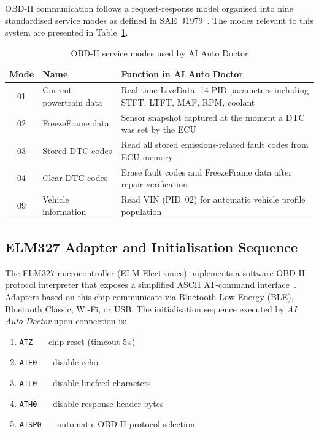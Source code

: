 OBD-II communication follows a request-response model organised into nine standardised service modes as defined in SAE~J1979~\cite{sae2020}.
The modes relevant to this system are presented in Table~\ref{tab:service_modes}.

\begin{table}[!htbp]
\centering
\caption{OBD-II service modes used by AI Auto Doctor}
\label{tab:service_modes}
\begin{tabularx}{0.95\linewidth}{c p{4cm} X}
\toprule
\rowcolor{tblhdr}
\color{white}\textbf{Mode} &
\color{white}\textbf{Name} &
\color{white}\textbf{Function in AI Auto Doctor} \\
\midrule
01 & Current powertrain data  & Real-time LiveData: 14 PID parameters including STFT, LTFT, MAF, RPM, coolant \\
02 & FreezeFrame data         & Sensor snapshot captured at the moment a DTC was set by the ECU \\
03 & Stored DTC codes         & Read all stored emissions-related fault codes from ECU memory \\
04 & Clear DTC codes          & Erase fault codes and FreezeFrame data after repair verification \\
09 & Vehicle information      & Read VIN (PID~02) for automatic vehicle profile population \\
\bottomrule
\end{tabularx}
\end{table}

\subsection{ELM327 Adapter and Initialisation Sequence}

The ELM327 microcontroller (ELM Electronics) implements a software OBD-II protocol interpreter that exposes a simplified ASCII AT-command interface~\cite{elm2019}.
Adapters based on this chip communicate via Bluetooth Low Energy (BLE), Bluetooth Classic, Wi-Fi, or USB.
The initialisation sequence executed by \textit{AI Auto Doctor} upon connection is:

\begin{enumerate}
  \item \texttt{ATZ}~--- chip reset (timeout 5\,s)
  \item \texttt{ATE0}~--- disable echo
  \item \texttt{ATL0}~--- disable linefeed characters
  \item \texttt{ATH0}~--- disable response header bytes
  \item \texttt{ATSP0}~--- automatic OBD-II protocol selection
\end{enumerate}


